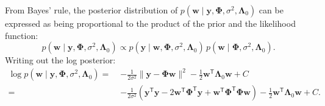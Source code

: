From Bayes’ rule, the posterior distribution of $p(\boldsymbol{w} \mid \boldsymbol{y}, \boldsymbol{\Phi}, \sigma^2, \boldsymbol{\Lambda}_0)$ can be expressed as being proportional to the product of the prior and the likelihood function: 
\begin{equation}
    p(\boldsymbol{w}\mid \boldsymbol{y}, \boldsymbol{\Phi}, \sigma^2, \boldsymbol{\Lambda}_0) \propto p(\boldsymbol{y}\mid \boldsymbol{w}, \boldsymbol{\Phi}, \sigma^2, \boldsymbol{\Lambda}_0) \, p(\boldsymbol{w}\mid \boldsymbol{\Phi}, \sigma^2, \boldsymbol{\Lambda}_0).
\end{equation}
Writing out the log posterior:
\begin{equation}
    \begin{aligned}
\log p(\boldsymbol{w}\mid \boldsymbol{y}, \boldsymbol{\Phi}, \sigma^2, \boldsymbol{\Lambda}_0) = \; & 
- \frac{1}{2 \sigma^2} \| \boldsymbol{y} - \mathbf{\Phi} \boldsymbol{w} \|^2
- \frac{1}{2} \boldsymbol{w}^\mathsf{T} \mathbf{\Lambda}_0 \boldsymbol{w} + C \\
=\; &
- \frac{1}{2 \sigma^2} \left( \boldsymbol{y}^\mathsf{T} \boldsymbol{y} 
- 2 \boldsymbol{w}^\mathsf{T} \mathbf{\Phi}^\mathsf{T} \boldsymbol{y} 
+ \boldsymbol{w}^\mathsf{T} \mathbf{\Phi}^\mathsf{T} \mathbf{\Phi} \boldsymbol{w} \right) 
- \frac{1}{2} \boldsymbol{w}^\mathsf{T} \mathbf{\Lambda}_0 \boldsymbol{w} + C.
\end{aligned}
\end{equation}

